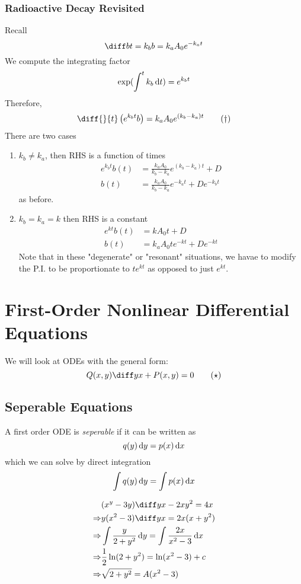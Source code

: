 \documentclass{article}
\begin{document}
\subsubsection*{Radioactive Decay Revisited}
Recall
\[
    \diff b t = k_b b = k_a A_0 e^{-k_a t}
\]
We compute the integrating factor
\[
    \exp(\int^{t}{k_b \mathop{}\!\mathrm{d} t}) = e^{k_b t}
\]
Therefore,
\[
    \diff{}{t} \bkt{e^{k_b t}b} = k_a A_0 e^{(k_b - k_a) t} \tag{$\dagger$}
\]
There are two cases
\begin{enumerate}
    \item $k_b \neq k_a$, then RHS is a function of times
    \begin{align*}
        e^{k_b t}b(t) &= \frac{k_a A_0}{k_b - k_a} e^{(k_b - k_a) t} + D \\
        b(t) &= \frac{k_a A_0}{k_b - k_a} e^{-k_a t} + De^{-k_b t}
    \end{align*}
    as before.
    \item $k_b = k_a = k$ then RHS is a constant
    \begin{align*}
        e^{k t}b(t) &= k A_0 t + D \\
        b(t) &= k_a A_0 t e^{-kt} + De^{-kt}
    \end{align*}
    Note that in these "degenerate" or "resonant" situations, we havae to modify the P.I. to be proportionate to $t e^{kt}$ as opposed to just $e^{kt}$.
\end{enumerate}

\section{First-Order Nonlinear Differential Equations}
We will look at ODEs with the general form:
\[
    Q(x, y) \diff yx + P(x, y) = 0 \tag{$\star$}
\]
\subsection{Seperable Equations}
\begin{defi}
    A first order ODE is \emph{seperable} if it can be written as
    \[
        q(y) \mathop{}\!\mathrm{d} y = p(x) \mathop{}\!\mathrm{d} x
    \]
    which we can solve by direct integration
    \[
        \int{q(y) \mathop{}\!\mathrm{d}y} = \int{p(x) \mathop{}\!\mathrm{d}x}
    \]
\end{defi}
\begin{eg}
    \begin{align*}
        &(x^y - 3y) \diff yx - 2xy^2 = 4x \\
        \Rightarrow& y(x^2 - 3) \diff yx = 2x(x+ y^2) \\
        \Rightarrow& \int{\frac{y}{2 + y^2} \diffd y} = \int{\frac{2x}{x^2 - 3} \diffd x} \\
        \Rightarrow& \frac 12 \ln(2 + y^2) = \ln(x^2 - 3) +c \\
        \Rightarrow& \sqrt{2 + y^2} = A(x^2 - 3)
    \end{align*}
\end{eg}
\end{document}
